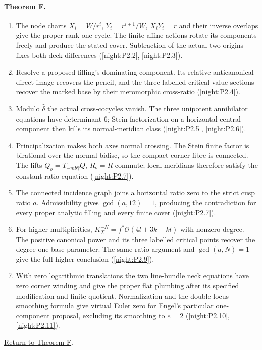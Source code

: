 \hypertarget{outline-I-F}{}
\paragraph{Theorem F.}
\begin{enumerate}[label=\arabic*.]
\item\hypertarget{step-I-F-1}{} The node charts
$X_i=W/r^i$, $Y_i=r^{i+1}/W$, $X_iY_i=r$ and their inverse
overlaps give the proper rank-one cycle.  The finite affine
actions rotate its components freely and produce the stated
cover.  Subtraction of the actual two origins fixes both deck
differences
(\hyperref[night:P2.2]{\ref*{night:P2.2}},
\hyperref[night:P2.3]{\ref*{night:P2.3}}).
\item\hypertarget{step-I-F-2}{} Resolve a proposed filling's
dominating component.  Its relative anticanonical direct image
recovers the pencil, and the three labelled critical-value
sections recover the marked base by their meromorphic cross-ratio
(\hyperref[night:P2.4]{\ref*{night:P2.4}}).
\item\hypertarget{step-I-F-3}{} Modulo $\widehat\delta$ the
actual cross-cocycles vanish.  The three unipotent annihilator
equations have determinant 6; Stein factorization on a horizontal
central component then kills its normal-meridian class
(\hyperref[night:P2.5]{\ref*{night:P2.5}},
\hyperref[night:P2.6]{\ref*{night:P2.6}}).
\item\hypertarget{step-I-F-4}{} Principalization makes both
axes normal crossing.  The Stein finite factor is birational
over the normal bidisc, so the compact corner fibre is connected.
The lifts $Q_o=T_{-mb\widehat\gamma}Q$, $R_o=R$ commute;
local meridians therefore satisfy the constant-ratio equation
(\hyperref[night:P2.7]{\ref*{night:P2.7}}).
\item\hypertarget{step-I-F-5}{} The connected incidence graph
joins a horizontal ratio zero to the strict cusp ratio $a$.
Admissibility gives $\gcd(a,12)=1$, producing the contradiction
for every proper analytic filling and every finite cover
(\hyperref[night:P2.7]{\ref*{night:P2.7}}).
\item\hypertarget{step-I-F-6}{} For higher multiplicities,
$K_X^{-N}=f^*\mathcal O(4l+3k-kl)$ with nonzero degree.
The positive canonical power and its three labelled critical
points recover the degree-one base parameter.  The same ratio
argument and $\gcd(a,N)=1$ give the full higher conclusion
(\hyperref[night:P2.9]{\ref*{night:P2.9}}).
\item\hypertarget{step-I-F-7}{} With zero logarithmic
translations the two line-bundle neck equations have zero
corner winding and give the proper flat plumbing after its
specified modification and finite quotient.  Normalization and
the double-locus smoothing formula give virtual Euler zero for
Engel's particular one-component proposal, excluding its
smoothing to $e=2$
(\hyperref[night:P2.10]{\ref*{night:P2.10}},
\hyperref[night:P2.11]{\ref*{night:P2.11}}).
\end{enumerate}
\hyperlink{main-I-F}{Return to Theorem F}.

